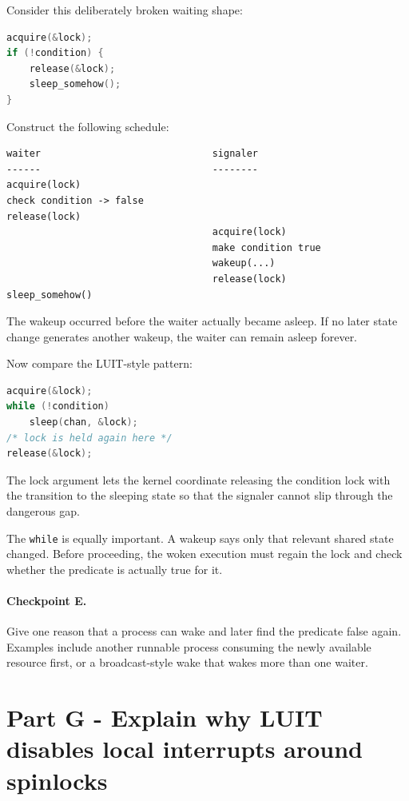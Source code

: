 \documentclass[11pt,a4paper]{article}
\newcommand{\file}[1]{\texttt{#1}}
\begin{document}
Consider this deliberately broken waiting shape:

\begin{lstlisting}[language=C]
acquire(&lock);
if (!condition) {
    release(&lock);
    sleep_somehow();
}
\end{lstlisting}

Construct the following schedule:

\begin{lstlisting}
waiter                              signaler
------                              --------
acquire(lock)
check condition -> false
release(lock)
                                    acquire(lock)
                                    make condition true
                                    wakeup(...)
                                    release(lock)
sleep_somehow()
\end{lstlisting}

The wakeup occurred before the waiter actually became asleep. If no later state change generates another wakeup, the waiter can remain asleep forever.

Now compare the LUIT-style pattern:

\begin{lstlisting}[language=C]
acquire(&lock);
while (!condition)
    sleep(chan, &lock);
/* lock is held again here */
release(&lock);
\end{lstlisting}

The lock argument lets the kernel coordinate releasing the condition lock with the transition to the sleeping state so that the signaler cannot slip through the dangerous gap.

The \file{while} is equally important. A wakeup says only that relevant shared state changed. Before proceeding, the woken execution must regain the lock and check whether the predicate is actually true for it.

\paragraph{Checkpoint E.} Give one reason that a process can wake and later find the predicate false again. Examples include another runnable process consuming the newly available resource first, or a broadcast-style wake that wakes more than one waiter.

\section{Part G - Explain why LUIT disables local interrupts around spinlocks}
\end{document}
